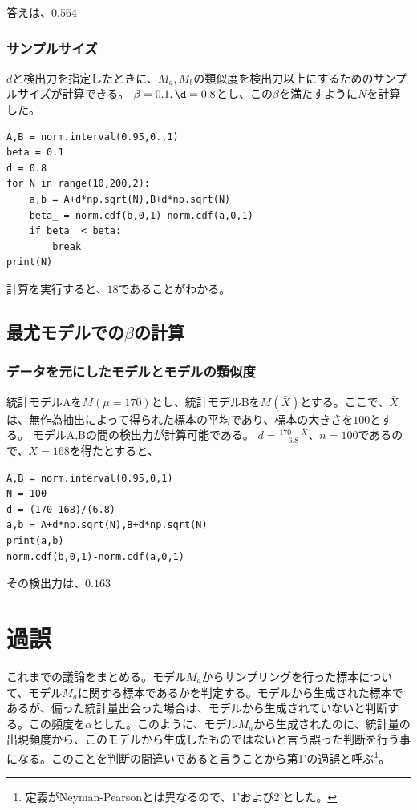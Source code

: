 答えは、$0.564$


\subsubsection{サンプルサイズ}
$d$と検出力を指定したときに、$M_a,M_b$の類似度を検出力以上にするためのサンプルサイズが計算できる。
$\beta=0.1,\d=0.8$とし、この$\beta$を満たすように$N$を計算した。

\begin{lstlisting}
A,B = norm.interval(0.95,0.,1)
beta = 0.1
d = 0.8
for N in range(10,200,2):
    a,b = A+d*np.sqrt(N),B+d*np.sqrt(N)
    beta_ = norm.cdf(b,0,1)-norm.cdf(a,0,1)
    if beta_ < beta:
        break
print(N)
\end{lstlisting}
計算を実行すると、$18$であることがわかる。



\subsection{最尤モデルでの$\beta$の計算}
\subsubsection{データを元にしたモデルとモデルの類似度}
統計モデルAを$M(\mu=170)$とし、統計モデルBを$M(\bar{X})$とする。ここで、$\bar{X}$は、無作為抽出によって得られた標本の平均であり、標本の大きさを$100$とする。
モデルA,Bの間の検出力が計算可能である。
$d=\frac{170-\bar{X}}{6.8}$、$n=100$であるので、$\bar{X}=168$を得たとすると、
\begin{lstlisting}
A,B = norm.interval(0.95,0,1)
N = 100
d = (170-168)/(6.8)
a,b = A+d*np.sqrt(N),B+d*np.sqrt(N)
print(a,b)
norm.cdf(b,0,1)-norm.cdf(a,0,1)
\end{lstlisting}
その検出力は、$0.163$


\section{過誤}
これまでの議論をまとめる。モデル$M_a$からサンプリングを行った標本について、モデル$M_a$に関する標本であるかを判定する。モデルから生成された標本であるが、偏った統計量出会った場合は、モデルから生成されていないと判断する。この頻度を$\alpha$とした。このように、モデル$M_a$から生成されたのに、統計量の出現頻度から、このモデルから生成したものではないと言う誤った判断を行う事になる。このことを判断の間違いであると言うことから第1'の過誤と呼ぶ\footnote{定義がNeyman-Pearsonとは異なるので、1'および2'とした。}。

